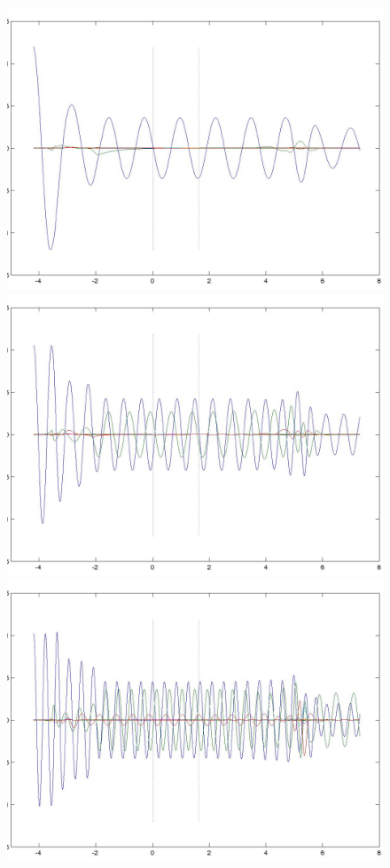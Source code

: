 \documentclass[numreferences]{kluwer}
\begin{document}
\begin{figure}[htb]
  \centering
  \includegraphics[width=\linewidth]{phin1a}
  \includegraphics[width=\linewidth]{phin2a}
  \includegraphics[width=\linewidth]{phin3a}

\end{figure}
\end{document}
